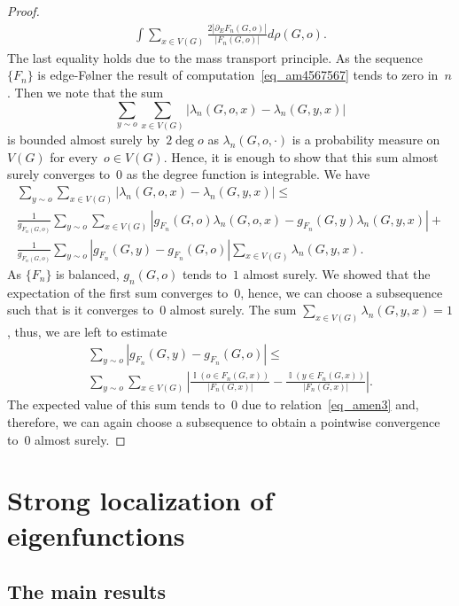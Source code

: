 \documentclass[10pt,a4paper]{amsart}
\DeclareMathOperator{\I}{{\mathbb{I}}}
\begin{document}
\begin{proof}
\begin{multline}
        \int \sum_{x \in V(G)} \frac{2|\partial_E F_n(G,o)|}{|F_n(G,o)|} d \rho(G,o).
    \end{multline}
    The last equality holds due to the mass transport principle. As the sequence~$\{F_n\}$ is edge-F\o lner the result of computation~\eqref{eq_am4567567} tends to zero in~$n$. 
    Then we note that the sum 
    $$
    \sum_{y \sim o} \sum_{x \in V(G)} |\lambda_n(G,o,x) - \lambda_n(G,y,x)|
    $$
    is bounded almost surely by~$2\deg o$ as $\lambda_n(G,o, \cdot)$ is a probability measure on~$V(G)$ for every~$o \in V(G)$. Hence, it is enough to show that this sum almost surely converges to~$0$ as the degree function is integrable. We have 
    \begin{multline}
        \sum_{y \sim o} \sum_{x \in V(G)} |\lambda_n(G,o,x) - \lambda_n(G,y,x)| \le \\
        \frac{1}{g_{F_n(G,o)}}\sum_{y \sim o} \sum_{x \in V(G)} |g_{F_n}(G,o)\lambda_n(G,o,x) - g_{F_n} (G,y)\lambda_n(G,y,x)| + \\
        \frac{1}{g_{F_n(G,o)}} \sum_{y \sim o} \left|{g_{F_n}(G,y)}- {g_{F_n}(G,o)}\right| \sum_{x \in V(G)} \lambda_n(G,y,x).
    \end{multline}
    As $\{F_n\}$ is balanced, $g_n(G,o)$ tends to~$1$ almost surely. We showed that the expectation of the first sum converges to~$0$, hence, we can choose a subsequence such that is it converges to~$0$ almost surely. The sum $\sum_{x  \in V(G)} \lambda_n(G, y, x) = 1$, thus, we are left to estimate 
    \begin{multline}
        \sum_{y \sim o} \left|{g_{F_n}(G,y)}- {g_{F_n}(G,o)}\right| \le \\
        \sum_{y\sim o}\sum_{x \in V(G)} \left| \frac{\I(o \in F_n(G,x))}{ |F_n(G,x)|} - \frac{\I(y \in F_n(G,x))}{ |F_n(G,x)|} \right|.
    \end{multline}
    The expected value of this sum tends to~$0$ due to relation~\eqref{eq_amen3} and, therefore, we can again choose a subsequence to obtain a pointwise convergence to~$0$ almost surely.
\end{proof}



\section{Strong localization of eigenfunctions}

\subsection{The main results}
\end{document}
